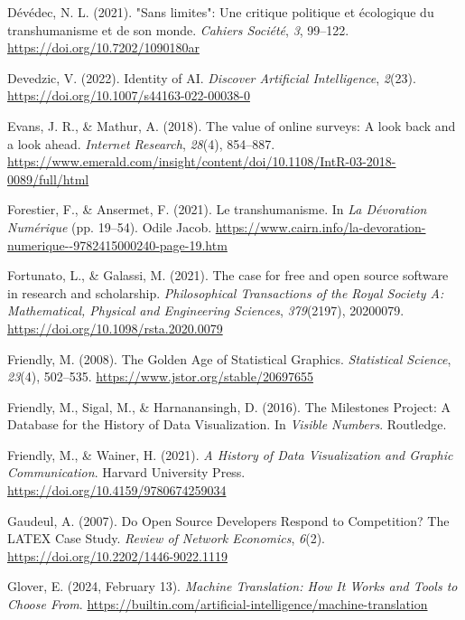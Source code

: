 \documentclass[
  letterpaper,
  DIV=11,
  numbers=noendperiod]{scrreprt}
\newlength{\cslhangindent}
\newenvironment{CSLReferences}[2] %
 {\begin{list}{}{%
  \setlength{\itemindent}{0pt}
  \setlength{\leftmargin}{0pt}
  \setlength{\parsep}{0pt}
  \ifodd #1
   \setlength{\leftmargin}{\cslhangindent}
   \setlength{\itemindent}{-1\cslhangindent}
  \fi
  \setlength{\itemsep}{#2\baselineskip}}}
 {\end{list}}
\begin{document}
\begin{CSLReferences}{1}{0}
Dévédec, N. L. (2021). "{Sans} limites": Une critique politique et
écologique du transhumanisme et de son monde. \emph{Cahiers Société},
\emph{3}, 99--122. \url{https://doi.org/10.7202/1090180ar}

Devedzic, V. (2022). Identity of {AI}. \emph{Discover Artificial
Intelligence}, \emph{2}(23).
\url{https://doi.org/10.1007/s44163-022-00038-0}

Evans, J. R., \& Mathur, A. (2018). The value of online surveys: {A}
look back and a look ahead. \emph{Internet Research}, \emph{28}(4),
854--887.
\url{https://www.emerald.com/insight/content/doi/10.1108/IntR-03-2018-0089/full/html}

Forestier, F., \& Ansermet, F. (2021). Le transhumanisme. In \emph{La
{Dévoration Numérique}} (pp. 19--54). Odile Jacob.
\url{https://www.cairn.info/la-devoration-numerique--9782415000240-page-19.htm}

Fortunato, L., \& Galassi, M. (2021). The case for free and open source
software in research and scholarship. \emph{Philosophical Transactions
of the Royal Society A: Mathematical, Physical and Engineering
Sciences}, \emph{379}(2197), 20200079.
\url{https://doi.org/10.1098/rsta.2020.0079}

Friendly, M. (2008). The {Golden Age} of {Statistical Graphics}.
\emph{Statistical Science}, \emph{23}(4), 502--535.
\url{https://www.jstor.org/stable/20697655}

Friendly, M., Sigal, M., \& Harnanansingh, D. (2016). The {Milestones
Project}: {A Database} for the {History} of {Data Visualization}. In
\emph{Visible {Numbers}}. Routledge.

Friendly, M., \& Wainer, H. (2021). \emph{A {History} of {Data
Visualization} and {Graphic Communication}}. Harvard University Press.
\url{https://doi.org/10.4159/9780674259034}

Gaudeul, A. (2007). Do {Open Source Developers Respond} to
{Competition}? {The LATEX Case Study}. \emph{Review of Network
Economics}, \emph{6}(2). \url{https://doi.org/10.2202/1446-9022.1119}

Glover, E. (2024, February 13). \emph{Machine {Translation}: {How It
Works} and {Tools} to {Choose From}}.
\url{https://builtin.com/artificial-intelligence/machine-translation}


\end{CSLReferences}
\end{document}
